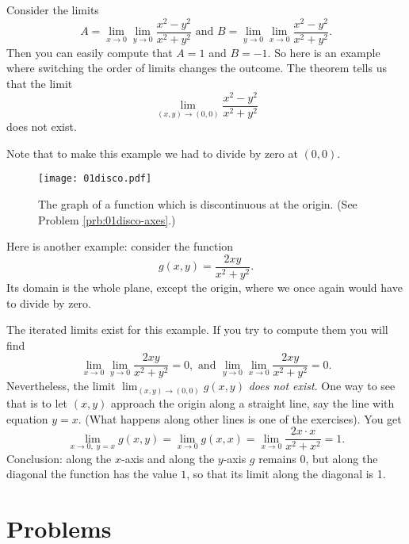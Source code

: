 Consider the limits
\[
A = \lim_{x\to 0}\lim_{y\to 0} \frac{x^2-y^2}{x^2+y^2} \text{ and }
B = \lim_{y\to 0}\lim_{x\to 0} \frac{x^2-y^2}{x^2+y^2}.
\]
Then you can easily compute that $A=1$ and $B=-1$.  So here is an
example where switching the order of limits changes the outcome.
The theorem tells us that the limit
\[
\lim_{(x, y) \to (0,0)} \frac{x^2-y^2}{x^2+y^2}
\]
does not exist.

Note that to make this example we had to divide by zero at $(0,0)$.

\begin{figure}[ht]\centering
  \texttt{[image: 01disco.pdf]}
  \caption{The graph of a function which is discontinuous at the
  origin. (See Problem \ref {prb:01disco-axes}.)}
  \label{fig:01disco}
\end{figure}

Here is another example: consider the function
\[
g(x, y) = \frac{2xy}{x^2+y^2}.
\]
Its domain is the whole plane, except the origin, where we once again
would have to divide by zero.

The iterated limits exist for this example.  If you try to compute
them you will find
\[
\lim_{x\to 0}\lim_{y\to 0} \frac{2xy}{x^2+y^2} = 0, \text{ and }
\lim_{y\to 0}\lim_{x\to 0} \frac{2xy}{x^2+y^2} = 0 .
\]
Nevertheless, the limit $\lim_{(x, y) \to (0,0)} g(x, y)$
\emph{does not exist}.  One way to see that is to let $(x, y)$
approach the origin along a straight line, say the line with equation
$y=x$. (What happens along other lines is one of the exercises).
You get
\[
\lim_{x\to 0, \; y=x} g(x, y) =
\lim_{x\to 0} g(x, x) =
\lim_{x\to 0} \frac{2x\cdot x}{x^2+x^2} = 1.
\]
Conclusion: along the $x$-axis and along the $y$-axis $g$ remains 0, but
along the diagonal the function has the value $1$, so that its limit along
the diagonal is 1.



\section{Problems} %

